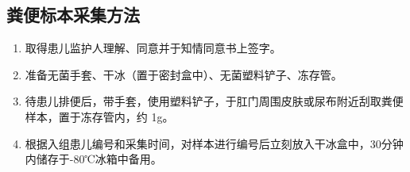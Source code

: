   \subsection{粪便标本采集方法}
  \label{粪便标本采集方法}
    \begin{enumerate}
      \item 取得患儿监护人理解、同意并于知情同意书上签字。
      \item 准备无菌手套、干冰（置于密封盒中）、无菌塑料铲子、冻存管。
      \item 待患儿排便后，带手套，使用塑料铲子，于肛门周围皮肤或尿布附近刮取粪便样本，置于冻存管内，约 1g。
      \item 根据入组患儿编号和采集时间，对样本进行编号后立刻放入干冰盒中，30分钟内储存于-80℃冰箱中备用。
    \end{enumerate}

